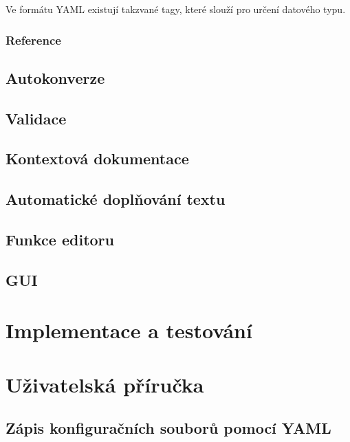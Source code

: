 \documentclass[FM,bw,DP]{tulthesis}
\begin{document}
Ve formátu YAML existují takzvané tagy, které slouží pro určení datového typu. 


\subsection{Reference}

\section{Autokonverze}

\section{Validace}

\section{Kontextová dokumentace}

\section{Automatické doplňování textu}

\section{Funkce editoru}

\section{GUI}


\chapter{Implementace a testování}






\chapter{Uživatelská příručka}

\section{Zápis konfiguračních souborů pomocí YAML}
\end{document}

